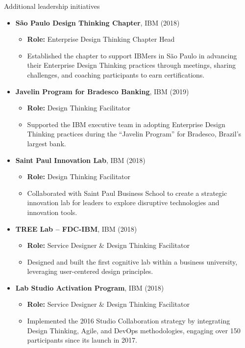 \documentclass{resume} %
\begin{document}
\begin{rSection}{Additional leadership initiatives}
\begin{itemize}
    \item \textbf{São Paulo Design Thinking Chapter}, \hfill IBM (2018) 
    \begin{itemize}
        \item \textbf{Role:} Enterprise Design Thinking Chapter Head
        \item Established the chapter to support IBMers in São Paulo in advancing their Enterprise Design Thinking practices through meetings, sharing challenges, and coaching participants to earn certifications.
    \end{itemize}
    
    \item \textbf{Javelin Program for Bradesco Banking}, \hfill IBM (2019) 
    \begin{itemize}
        \item \textbf{Role:} Design Thinking Facilitator
        \item Supported the IBM executive team in adopting Enterprise Design Thinking practices during the “Javelin Program” for Bradesco, Brazil's largest bank.
    \end{itemize}
    
    \item \textbf{Saint Paul Innovation Lab}, \hfill IBM (2018) 
    \begin{itemize}
        \item \textbf{Role:} Design Thinking Facilitator
        \item Collaborated with Saint Paul Business School to create a strategic innovation lab for leaders to explore disruptive technologies and innovation tools.
    \end{itemize}
    
    \item \textbf{TREE Lab – FDC-IBM}, \hfill IBM (2018) 
    \begin{itemize}
        \item \textbf{Role:} Service Designer \& Design Thinking Facilitator
        \item Designed and built the first cognitive lab within a business university, leveraging user-centered design principles.
    \end{itemize}
    
    \item \textbf{Lab Studio Activation Program}, \hfill IBM (2018) 
    \begin{itemize}
        \item \textbf{Role:} Service Designer \& Design Thinking Facilitator
        \item Implemented the 2016 Studio Collaboration strategy by integrating Design Thinking, Agile, and DevOps methodologies, engaging over 150 participants since its launch in 2017.
    \end{itemize}
    

\end{itemize}
\end{rSection}
\end{document}
